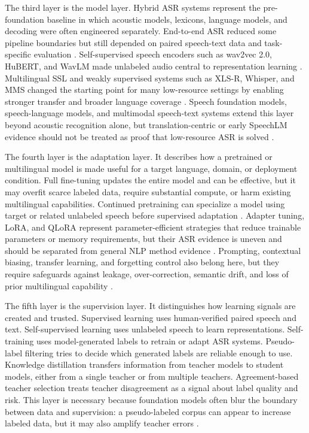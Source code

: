 \documentclass[pdflatex,sn-basic,iicol]{sn-jnl}
\theoremstyle{thmstyleone}
\theoremstyle{thmstyletwo}
\theoremstyle{thmstylethree}
\begin{document}
The third layer is the model layer. Hybrid ASR systems represent the pre-foundation baseline in which acoustic models, lexicons, language models, and decoding were often engineered separately. End-to-end ASR reduced some pipeline boundaries but still depended on paired speech-text data and task-specific evaluation \citep{prabhavalkar2023_e2e_asr_survey}. Self-supervised speech encoders such as wav2vec 2.0, HuBERT, and WavLM made unlabeled audio central to representation learning \citep{mohamed2022_ssl_review,baevski2020wav2vec2,hsu2021hubert,chen2022wavlm}. Multilingual SSL and weakly supervised systems such as XLS-R, Whisper, and MMS changed the starting point for many low-resource settings by enabling stronger transfer and broader language coverage \citep{babu22_interspeech,pmlr-v202-radford23a,pratap2024mms}. Speech foundation models, speech-language models, and multimodal speech-text systems extend this layer beyond acoustic recognition alone, but translation-centric or early SpeechLM evidence should not be treated as proof that low-resource ASR is solved \citep{seamless2025_joint_speech_text_mt,tian25b_interspeech}.

The fourth layer is the adaptation layer. It describes how a pretrained or multilingual model is made useful for a target language, domain, or deployment condition. Full fine-tuning updates the entire model and can be effective, but it may overfit scarce labeled data, require substantial compute, or harm existing multilingual capabilities. Continued pretraining can specialize a model using target or related unlabeled speech before supervised adaptation \citep{getman24_interspeech}. Adapter tuning, LoRA, and QLoRA represent parameter-efficient strategies that reduce trainable parameters or memory requirements, but their ASR evidence is uneven and should be separated from general NLP method evidence \citep{pmlr-v97-houlsby19a,hu2022lora,dettmers2023qlora}. Prompting, contextual biasing, transfer learning, and forgetting control also belong here, but they require safeguards against leakage, over-correction, semantic drift, and loss of prior multilingual capability \citep{udupa24_interspeech,qian24_interspeech}.

The fifth layer is the supervision layer. It distinguishes how learning signals are created and trusted. Supervised learning uses human-verified paired speech and text. Self-supervised learning uses unlabeled speech to learn representations. Self-training uses model-generated labels to retrain or adapt ASR systems. Pseudo-label filtering tries to decide which generated labels are reliable enough to use. Knowledge distillation transfers information from teacher models to student models, either from a single teacher or from multiple teachers. Agreement-based teacher selection treats teacher disagreement as a signal about label quality and risk. This layer is necessary because foundation models often blur the boundary between data and supervision: a pseudo-labeled corpus can appear to increase labeled data, but it may also amplify teacher errors \citep{kahn2019selftraining,park20d_interspeech,khurana2020dust,leal21_interspeech,farooq2023must,ferraz2023multilingualdistilwhisper,bhogale24_interspeech}.
\end{document}
